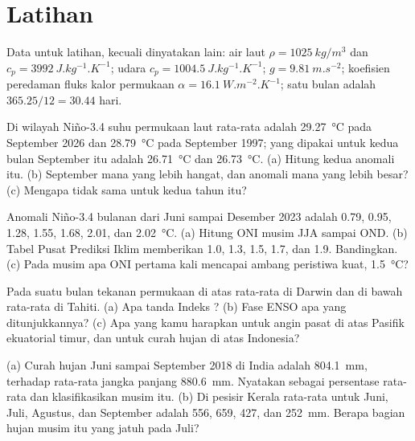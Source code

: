 \section*{Latihan}\label{sec:b2:climate-variability:exercises}

Data untuk latihan, kecuali dinyatakan lain: air laut $\rho = \qty{1025}{kg/m^3}$ dan $c_p =
\qty{3992}{J.kg^{-1}.K^{-1}}$; udara $c_p = \qty{1004.5}{J.kg^{-1}.K^{-1}}$; $g =
\qty{9.81}{m.s^{-2}}$; koefisien peredaman fluks kalor permukaan $\alpha =
\qty{16.1}{W.m^{-2}.K^{-1}}$; satu bulan adalah $365.25/12 = 30.44$ hari.

\begin{exercise}[$\star$]\label{exo:b2:climate-variability:1}
Di wilayah Niño-3.4 suhu permukaan laut rata-rata adalah \qty{29.27}{\celsius} pada September
2026 dan \qty{28.79}{\celsius} pada September 1997;  yang dipakai untuk kedua bulan September itu
adalah \qty{26.71}{\celsius} dan \qty{26.73}{\celsius}. (a) Hitung kedua anomali itu. (b) September
mana yang lebih hangat, dan anomali mana yang lebih besar? (c) Mengapa  tidak sama untuk
kedua tahun itu?
\end{exercise}

\begin{exercise}[$\star$]\label{exo:b2:climate-variability:2}
Anomali Niño-3.4 bulanan dari Juni sampai Desember 2023 adalah 0.79, 0.95, 1.28, 1.55, 1.68, 2.01,
dan \qty{2.02}{\celsius}. (a) Hitung ONI musim JJA sampai OND. (b) Tabel
Pusat Prediksi Iklim memberikan 1.0, 1.3, 1.5, 1.7, dan 1.9. Bandingkan. (c) Pada musim apa
ONI pertama kali mencapai ambang peristiwa kuat, \qty{1.5}{\celsius}?
\end{exercise}

\begin{exercise}[$\star$]\label{exo:b2:climate-variability:3}
Pada suatu bulan tekanan permukaan di atas rata-rata di Darwin dan di bawah rata-rata di Tahiti.
(a) Apa tanda Indeks ? (b) Fase ENSO apa yang ditunjukkannya?
(c) Apa yang kamu harapkan untuk angin pasat di atas Pasifik ekuatorial timur, dan untuk
curah hujan di atas Indonesia?
\end{exercise}

\begin{exercise}[$\star$]\label{exo:b2:climate-variability:4}
(a) Curah hujan Juni sampai September 2018 di India adalah \qty{804.1}{mm}, terhadap
rata-rata jangka panjang \qty{880.6}{mm}. Nyatakan sebagai persentase rata-rata dan klasifikasikan
musim itu. (b) Di pesisir Kerala rata-rata untuk Juni, Juli, Agustus, dan September adalah 556,
659, 427, dan \qty{252}{mm}. Berapa bagian hujan musim itu yang jatuh pada Juli?
\end{exercise}


